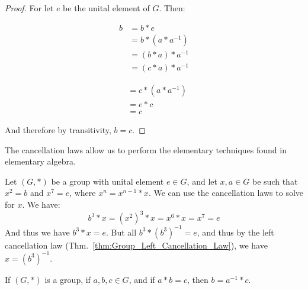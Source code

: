     \begin{proof}
        For let $e$ be the unital element of $G$. Then:
        \par
        \begin{minipage}[t]{0.49\textwidth}
            \centering
            \begin{align}
                b&=b*e
                \tag{Identity}\\
                &=b*(a*a^{\minus{1}})
                \tag{Inverse}\\
                &=(b*a)*a^{\minus{1}}
                \tag{Associativity}\\
                &=(c*a)*a^{\minus{1}}
                \tag{Hypothesis}
            \end{align}
        \end{minipage}
        \hfill
        \begin{minipage}[t]{0.49\textwidth}
            \centering
            \begin{align}
                &=c*(a*a^{\minus{1}})
                \tag{Associativity}\\
                &=e*c
                \tag{Inverse}\\
                &=c
                \tag{Identity}
            \end{align}
        \end{minipage}
        \par\vspace{2.5ex}
        And therefore by transitivity, $b=c$.
    \end{proof}
    The cancellation laws allow us to perform the elementary techniques found
    in elementary algebra.
    \begin{example}
        Let $(G,*)$ be a group with unital element $e\in{G}$, and let
        $x,a\in{G}$ be such that $x^{2}=b$ and $x^{7}=e$, where
        $x^{n}=x^{n-1}*x$. We can use the cancellation laws to solve for $x$.
        We have:
        \begin{equation}
            b^{3}*x=(x^{2})^{3}*x=x^{6}*x=x^{7}=e
        \end{equation}
        And thus we have $b^{3}*x=e$. But all $b^{3}*(b^{3})^{\minus{1}}=e$, and
        thus by the left cancellation law
        (Thm.~\ref{thm:Group_Left_Cancellation_Law}), we have
        $x=(b^{3})^{\minus{1}}$.
    \end{example}
    \begin{theorem}
        \label{thm:Group_Simplifying_on_Left}%
        If $(G,*)$ is a group, if $a,b,c\in{G}$, and if $a*b=c$, then
        $b=a^{\minus{1}}*c$.
    \end{theorem}

